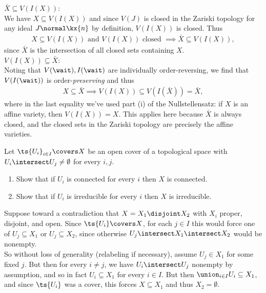 \begin{solution}

\hfill

\(\bar X \subseteq V(I(X))\):\\
We have \(X\subseteq V(I(X))\) and since \(V(J)\) is closed in the
Zariski topology for any ideal \(J \normal \kx{n}\) by definition,
\(V(I(X))\) is closed. Thus
\begin{align*}  
X\subseteq V(I(X)) \text{ and } V(I(X))\text{ closed } \implies \bar X \subseteq V(I(X))
,\end{align*} since \(\bar X\) is the intersection of all closed sets
containing \(X\).\\

\(V(I(X)) \subseteq \bar X\):\\
Noting that \(V(\wait), I(\wait)\) are individually order-reversing, we
find that \(V(I(\wait))\) is order-\emph{preserving} and thus
\begin{align*}  
X\subseteq \bar X \implies V(I(X)) \subseteq V(I(\bar X)) = \bar X
,\end{align*} where in the last equality we've used part (i) of the
Nullstellensatz: if \(X\) is an affine variety, then \(V(I(X)) = X\).
This applies here because \(\bar X\) is always closed, and the closed
sets in the Zariski topology are precisely the affine varieties.

\end{solution}

\begin{exercise}[Gathmann 2.21]

Let \(\ts{U_i}_{i\in I} \covers X\) be an open cover of a topological
space with \(U_i \intersect U_j \neq \emptyset\) for every \(i, j\).

\begin{enumerate}
\def\labelenumi{\alph{enumi}.}
\item
  Show that if \(U_i\) is connected for every \(i\) then \(X\) is
  connected.
\item
  Show that if \(U_i\) is irreducible for every \(i\) then \(X\) is
  irreducible.
\end{enumerate}

\end{exercise}

\begin{solution}[a]

Suppose toward a contradiction that \(X = X_1 \disjoint X_2\) with
\(X_i\) proper, disjoint, and open. Since \(\ts{U_i} \covers X\), for
each \(j\in I\) this would force one of \(U_j \subseteq X_1\) or
\(U_j \subseteq X_2\), since otherwise
\(U_j \intersect X_1 \intersect X_2\) would be nonempty.\\
So without loss of generality (relabeling if necessary), assume
\(U_j \in X_1\) for some fixed \(j\). But then for every \(i\neq j\), we
have \(U_i \intersect U_j\) nonempty by assumption, and so in fact
\(U_i \subseteq X_1\) for every \(i\in I\). But then
\(\union_{i\in I}U_i \subseteq X_1\), and since \(\ts{U_i}\) was a
cover, this forces \(X\subseteq X_1\) and thus \(X_2 = \emptyset\).

\end{solution}

